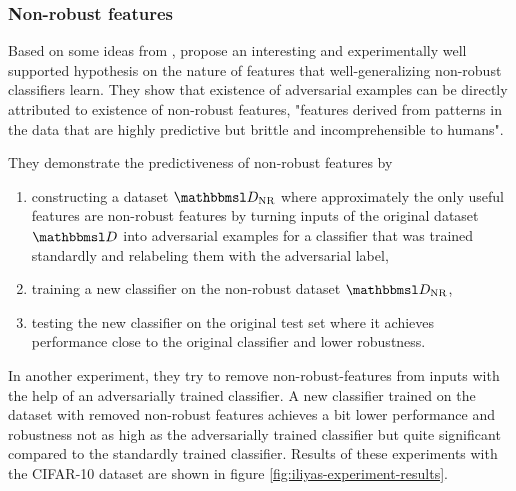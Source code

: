 \documentclass{article}
\begin{document}
\subsubsection{Non-robust features}

Based on some ideas from \citet{Tsipras:2018:RMBOA},  \citet{Ilyas:2019:AENBTF} propose an interesting and experimentally well supported hypothesis on the nature of features that well-generalizing non-robust classifiers learn. They show that existence of adversarial examples can be directly attributed to existence of  non-robust features, "features derived from patterns in the data that are highly predictive but brittle and incomprehensible to humans". 

They demonstrate the predictiveness of non-robust features by 
\begin{enumerate}
	\item constructing a dataset $\set D_\text{NR}$ where approximately the only useful features are non-robust features by turning inputs of the original dataset $\set D$ into adversarial examples for a classifier that was trained standardly and relabeling them with the adversarial label,
	\item training a new classifier on the non-robust dataset $\set D_\text{NR}$,
	\item testing the new classifier on the original test set where it achieves performance close to the original classifier and lower robustness.
\end{enumerate}

In another experiment, they try to remove non-robust-features from inputs with the help of an adversarially trained classifier. A new classifier trained on the dataset with removed non-robust features achieves a bit lower performance and robustness not as high as the adversarially trained classifier but quite significant compared to the standardly trained classifier. Results of these experiments with the CIFAR-10 dataset \citep{Krizhevsky:2009:LMLFTI} are shown in figure \ref{fig:iliyas-experiment-results}.
\end{document}
